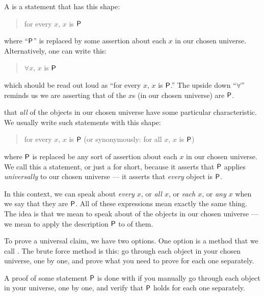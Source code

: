 \documentclass[../../../main.tex]{subfiles}
\begin{document}
\begin{terminology}
  A  is a statement that has this shape:
    
  \begin{quote}
    for every $x$, $x$ is $\P/$
  \end{quote}
    
  \noindent
  where ``$\P/$'' is replaced by some assertion about each $x$ in our chosen universe. Alternatively, one can write this:
    
  \begin{quote}
    $\forall x$, $x$ is $\P/$ 
  \end{quote}
    
  \noindent
  which should be read out loud as ``for every $x$, $x$ is $\P/$.'' The upside down ``$\forall$'' reminds us we are asserting that  of the $x$s (in our chosen universe) are $\P/$.
\end{terminology}

 that \emph{all} of the objects in our chosen universe have some particular characteristic. We usually write such statements with this shape:

\begin{quote}
  for every $x$, $x$ is $\P/$ (or synonymously: for all $x$, $x$ is $\P/$) 
\end{quote}

\noindent
where $\P/$ is replaced be any sort of assertion about each $x$ in our chosen universe. We call this a  statement, or just a  for short, because it asserts that $\P/$ applies \emph{universally} to our chosen universe --- it asserts that \emph{every} object is $\P/$.

In this context, we can speak about \emph{every $x$}, or \emph{all $x$}, or \emph{each $x$}, or \emph{any $x$} when we say that they are $\P/$. All of these expressions mean exactly the same thing. The idea is that we mean to speak about  of the objects in our chosen universe --- we mean to apply the description $\P/$ to  of them.

To prove a universal claim, we have two options. One option is a method that we call . The brute force method is this: go through each object in your chosen universe, one by one, and prove what you need to prove for each one separately.

\begin{terminology}
  A proof of some statement $\P/$ is done with  if you manually go through each object in your universe, one by one, and verify that $\P/$ holds for each one separately.
\end{terminology}
\end{document}
